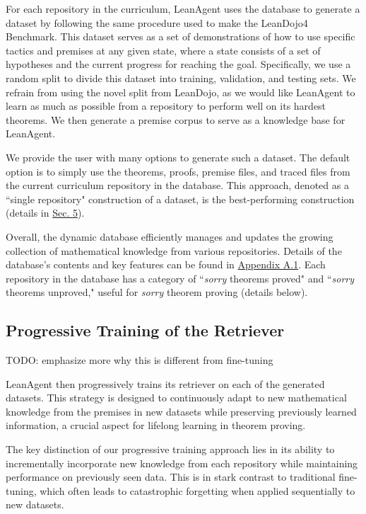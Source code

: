 \documentclass{article} %
\begin{document}
For each repository in the curriculum, LeanAgent uses the database to generate a dataset by following the same procedure used to make the LeanDojo4 Benchmark. This dataset serves as a set of demonstrations of how to use specific tactics and premises at any given state, where a state consists of a set of hypotheses and the current progress for reaching the goal. Specifically, we use a random split to divide this dataset into training, validation, and testing sets. We refrain from using the novel split from LeanDojo, as we would like LeanAgent to learn as much as possible from a repository to perform well on its hardest theorems. We then generate a premise corpus to serve as a knowledge base for LeanAgent.

We provide the user with many options to generate such a dataset. The default option is to simply use the theorems, proofs, premise files, and traced files from the current curriculum repository in the database. This approach, denoted as a ``single repository" construction of a dataset, is the best-performing construction (details in \hyperref[sec:experiments]{Sec. 5}).

Overall, the dynamic database efficiently manages and updates the growing collection of mathematical knowledge from various repositories. Details of the database's contents and key features can be found in \hyperref[sec:implementation_details]{Appendix A.1}. Each repository in the database has a category of ``\textit{sorry} theorems proved" and ``\textit{sorry} theorems unproved," useful for \textit{sorry} theorem proving (details below).

\subsection{Progressive Training of the Retriever}

TODO: emphasize more why this is different from fine-tuning

LeanAgent then progressively trains its retriever on each of the generated datasets. This strategy is designed to continuously adapt to new mathematical knowledge from the premises in new datasets while preserving previously learned information, a crucial aspect for lifelong learning in theorem proving.

The key distinction of our progressive training approach lies in its ability to incrementally incorporate new knowledge from each repository while maintaining performance on previously seen data. This is in stark contrast to traditional fine-tuning, which often leads to catastrophic forgetting when applied sequentially to new datasets.
\end{document}

